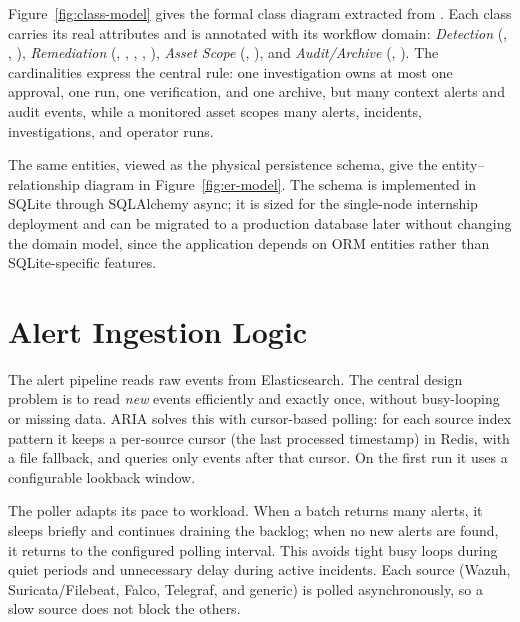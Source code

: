 Figure~\ref{fig:class-model} gives the formal class diagram extracted from . Each class carries its real attributes and is annotated with its workflow domain: \emph{Detection} (, , ), \emph{Remediation} (, , , , ), \emph{Asset Scope} (, ), and \emph{Audit/Archive} (, ). The cardinalities express the central rule: one investigation owns at most one approval, one run, one verification, and one archive, but many context alerts and audit events, while a monitored asset scopes many alerts, incidents, investigations, and operator runs.


The same entities, viewed as the physical persistence schema, give the entity--relationship diagram in Figure~\ref{fig:er-model}. The schema is implemented in SQLite through SQLAlchemy async; it is sized for the single-node internship deployment and can be migrated to a production database later without changing the domain model, since the application depends on ORM entities rather than SQLite-specific features.



\section{Alert Ingestion Logic}

The alert pipeline reads raw events from Elasticsearch. The central design problem is to read \emph{new} events efficiently and exactly once, without busy-looping or missing data. ARIA solves this with cursor-based polling: for each source index pattern it keeps a per-source cursor (the last processed timestamp) in Redis, with a file fallback, and queries only events after that cursor. On the first run it uses a configurable lookback window.

The poller adapts its pace to workload. When a batch returns many alerts, it sleeps briefly and continues draining the backlog; when no new alerts are found, it returns to the configured polling interval. This avoids tight busy loops during quiet periods and unnecessary delay during active incidents. Each source (Wazuh, Suricata/Filebeat, Falco, Telegraf, and generic) is polled asynchronously, so a slow source does not block the others.

